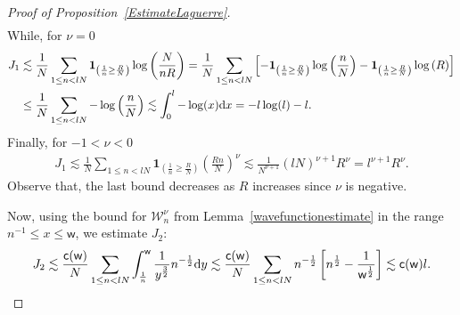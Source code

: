 \documentclass[pdftex]{sigma}
\numberwithin{equation}{section}
\begin{document}
\begin{proof}[Proof of Proposition~\ref{EstimateLaguerre}]
\begin{gather*}
\end{gather*}
While, for $\nu=0$
\begin{align*}
J_1 & \lesssim \frac{1}{N} \sum_{1 \le n <lN}^{}\textbf{1}_{\left(\frac{1}{n}\ge \frac{R}{N}\right)} \log \left(\frac{N}{nR}\right)=\frac{1}{N}\sum_{1 \le n <lN}^{}\left[-\textbf{1}_{\left(\frac{1}{n}\ge \frac{R}{N}\right)} \log \left(\frac{n}{N}\right)-\textbf{1}_{\left(\frac{1}{n}\ge \frac{R}{N}\right)} \log \left(R\right)\right]\\
 &\le \frac{1}{N}\sum_{1 \le n <lN}^{}- \log \left(\frac{n}{N}\right) \lesssim \int_{0}^{l}-\log(x){\rm d}x=-l\log(l)-l.
\end{align*}
Finally, for $-1<\nu<0$
\begin{gather*}
J_1 \lesssim \frac{1}{N} \sum_{1 \le n <lN}^{}\textbf{1}_{\left(\frac{1}{n}\ge \frac{R}{N}\right)} \left(\frac{Rn}{N}\right)^\nu \lesssim \frac{1}{N^{\nu+1}}\left(lN\right)^{\nu+1}R^\nu=l^{\nu+1}R^\nu.
\end{gather*}
Observe that, the last bound decreases as $R$ increases since $\nu$ is negative.

Now, using the bound for $\mathcal{W}_n^{\nu}$ from Lemma~\ref{wavefunctionestimate} in the range $n^{-1} \le x \le \mathsf{w}$, we estimate $J_2$:
\begin{gather*}
J_2 \lesssim \frac{\mathsf{c}(\mathsf{w})}{N} \sum_{1 \le n < lN}^{} \int_{\frac{1}{n}}^{\mathsf{w}} \frac{1}{y^{\frac{3}{2}}}n^{-\frac{1}{2}}{\rm d}y \lesssim \frac{\mathsf{c}(\mathsf{w})}{N} \sum_{1 \le n < lN}^{}n^{-\frac{1}{2}} \left[n^{\frac{1}{2}}-\frac{1}{\mathsf{w}^{\frac{1}{2}}}\right] \lesssim \mathsf{c}(\mathsf{w})l.
\end{gather*}


\end{proof}
\end{document}
